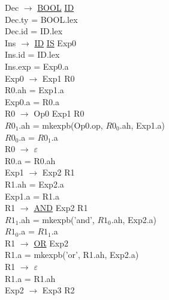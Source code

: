 \documentclass[\main/MemoriaPL.tex]{subfiles}
\begin{document}
    Dec $\rightarrow$ \underline{BOOL} \underline{ID}\\
    \hspace{5mm}Dec.ty = BOOL.lex\\
    \hspace{5mm}Dec.id = ID.lex\\
    Ins $\rightarrow$ \underline{ID} \underline{IS} Exp0\\
    \hspace{5mm}Ins.id = ID.lex\\
    \hspace{5mm}Ins.exp = Exp0.a\\
    Exp0 $\rightarrow$ Exp1 R0\\
    \hspace{5mm}R0.ah = Exp1.a\\
    \hspace{5mm}Exp0.a = R0.a\\
    R0 $\rightarrow$ Op0 Exp1 R0\\
    \hspace{5mm}$R0_1$.ah = mkexpb(Op0.op, $R0_0$.ah, Exp1.a)\\
    \hspace{5mm}$R0_0$.a = $R0_1$.a\\
    R0 $\rightarrow$ $\varepsilon$\\
    \hspace{5mm}R0.a = R0.ah\\
    Exp1 $\rightarrow$ Exp2 R1\\
    \hspace{5mm}R1.ah = Exp2.a\\
    \hspace{5mm}Exp1.a = R1.a\\
    R1 $\rightarrow$ \underline{AND} Exp2 R1\\
    \hspace{5mm}$R1_1$.ah = mkexpb('and', $R1_0$.ah, Exp2.a)\\
    \hspace{5mm}$R1_0$.a = $R1_1$.a\\
    R1 $\rightarrow$ \underline{OR} Exp2\\
    \hspace{5mm}R1.a = mkexpb('or', R1.ah, Exp2.a)\\
    R1 $\rightarrow$ $\varepsilon$\\
    \hspace{5mm}R1.a = R1.ah\\
    Exp2 $\rightarrow$ Exp3 R2\\
\end{document}
